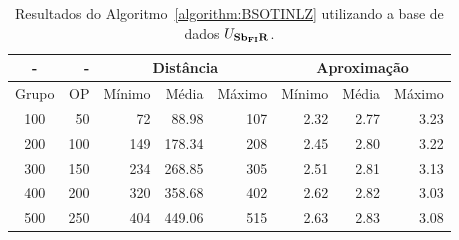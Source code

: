 \begin{table}[!htb]
  \caption{Resultados do Algoritmo~\ref{algorithm:BSOTINLZ} utilizando a base de dados $U_{\textbf{Sb\textsubscript{FI}R}}{}$.}
  \label{table:APQPJYRX}
  \centering
  \begin{tabular}{|c|r|r|r|r|r|r|r|}
    \hline
      -      &  -   & \multicolumn{3}{c|}{Distância}             & \multicolumn{3}{c|}{Aproximação}           \\ \hline
    Grupo    & OP   & Mínimo       & Média        & Máximo       & Mínimo       & Média        & Máximo       \\ \hline  
    100      & 50   & 72           &  88.98       & 107          & 2.32         & 2.77         & 3.23         \\ \hline
    200      & 100  & 149          & 178.34       & 208          & 2.45         & 2.80         & 3.22         \\ \hline
    300      & 150  & 234          & 268.85       & 305          & 2.51         & 2.81         & 3.13         \\ \hline
    400      & 200  & 320          & 358.68       & 402          & 2.62         & 2.82         & 3.03         \\ \hline
    500      & 250  & 404          & 449.06       & 515          & 2.63         & 2.83         & 3.08         \\ \hline    
  \end{tabular}
\end{table}